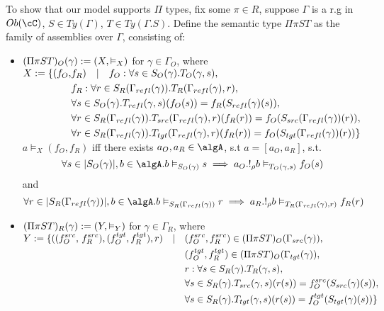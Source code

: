 \documentclass[12pt,a4paper]{article}
\def\src{_{src}}\alwaysmath{src}
\def\rfl{_{refl}}\alwaysmath{rfl}
\def\tgt{_{tgt}}\alwaysmath{tgt}
\renewcommand{\O}{_{O}}
\newcommand{\R}{\ensuremath{_{R}}}
\begin{document}
To show that our model supports $\Pi$ types, fix some $\pi \in R$, suppose $\Gamma$ is a r.g in $\ob\cC$, $S \in Ty(\Gamma)$, $T \in Ty(\Gamma . S)$. 
Define the semantic type $\Pi \pi S T$ as the family of assemblies over $\Gamma$, consisting of:
\begin{itemize}
  \item $(\Pi \pi S T)\O(\gamma) \define (X, \vDash_X)$ for $\gamma \in \Gamma\O$, where
    \subitem
        $\begin{aligned}
          X \define \{ (f\O,& f\R) \quad | \quad f\O : \forall s \in S\O(\gamma).T\O(\gamma, s),\\
          & f\R : \forall r \in S\R(\Gamma\rfl(\gamma)). T\R(\Gamma\rfl(\gamma), r),\\
          & \forall s \in S\O(\gamma). T\rfl(\gamma, s)(f\O (s)) = f\R(S\rfl(\gamma)(s)),\\
          & \forall r \in S\R(\Gamma\rfl(\gamma)). T\src(\Gamma\rfl(\gamma),r)(f\R (r)) = f\O(S\src(\Gamma\rfl(\gamma))(r)),\\
          & \forall r \in S\R(\Gamma\rfl(\gamma)). T\tgt(\Gamma\rfl(\gamma),r)(f\R (r)) = f\O(S\tgt(\Gamma\rfl(\gamma))(r))  \}
        \end{aligned}$\\
    
    \subitem $a \vDash_X (f\O, f\R)$ iff there exists $a\O, a\R \in \algA$, s.t $ a = [a\O, a\R]$, s.t.
    $$\forall s \in \carr{S\O(\gamma)}, b \in \algA . b \vDash_{S\O(\gamma)} s \implies a\O . !_\rho b \vDash_{T\O(\gamma,s)} f\O(s)$$ and 
    $$\forall r \in \carr{S\R(\Gamma\rfl(\gamma))}, b \in \algA . b \vDash_{S\R(\Gamma\rfl(\gamma))} r \implies a\R . !_\rho b \vDash_{T\R(\Gamma\rfl(\gamma),r)} f\R(r)$$ 
    
    \item $(\Pi \pi S T)\R(\gamma) \define (Y, \vDash_Y)$ for $\gamma \in \Gamma\R$, where
    \subitem
     $\begin{aligned}
           Y \define \{( (f\O^{src}, \, f\R^{src}), (f\O^{tgt}, f\R^{tgt}), r)  \quad|\quad
            & (f\O^{src},f\R^{src}) \in (\Pi\pi S T)\O(\Gamma\src(\gamma)),\\
            & (f\O^{tgt},f\R^{tgt}) \in (\Pi\pi S T)\O(\Gamma\tgt(\gamma)),\\
            & r : \forall s \in S\R(\gamma). T\R(\gamma, s),\\     
            & \forall s \in S\R(\gamma). T\src(\gamma, s)( r (s)) = f\O^{src}(S\src(\gamma)(s)),\\
            & \forall s \in S\R(\gamma). T\tgt(\gamma, s)( r (s)) = f\O^{tgt}(S\tgt(\gamma)(s)) \}
      \end{aligned}$\\
    

\end{itemize}
\end{document}
